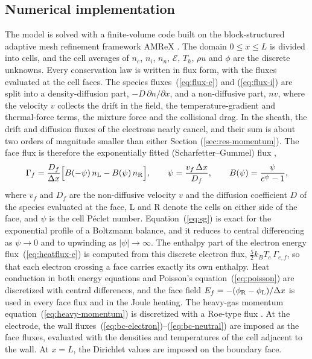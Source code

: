 \subsection{Numerical implementation}
\label{sec:numerics}

The model is solved with a finite-volume code built on the block-structured adaptive mesh refinement framework AMReX \cite{amrex2019}. The domain \(0\le x\le L\) is divided into cells, and the cell averages of \(n_e\), \(n_i\), \(n_n\), \(\mathcal{E}\), \(T_h\), \(\rho u\) and \(\phi\) are the discrete unknowns. Every conservation law is written in flux form, with the fluxes evaluated at the cell faces. The species fluxes~(\ref{eq:flux-e}) and (\ref{eq:flux-i}) are split into a density-diffusion part, \(-D\,\partial n/\partial x\), and a non-diffusive part, \(nv\), where the velocity \(v\) collects the drift in the field, the temperature-gradient and thermal-force terms, the mixture force and the collisional drag. In the sheath, the drift and diffusion fluxes of the electrons nearly cancel, and their sum is about two orders of magnitude smaller than either Section (\ref{sec:res-momentum}). The face flux is therefore the exponentially fitted (Scharfetter--Gummel) flux \cite{scharfetter1969},
\begin{equation}
\Gamma_{f}=\frac{D_f}{\Delta x}\Big[B(-\psi)\,n_{\rm L}-B(\psi)\,n_{\rm R}\Big],
\qquad
\psi=\frac{v_f\,\Delta x}{D_f},
\qquad
B(\psi)=\frac{\psi}{e^{\psi}-1},
\label{eq:sg}
\end{equation}
where \(v_f\) and \(D_f\) are the non-diffusive velocity \(v\) and the diffusion coefficient \(D\) of the species evaluated at the face, L and R denote the cells on either side of the face, and \(\psi\) is the cell Péclet number. Equation~(\ref{eq:sg}) is exact for the exponential profile of a Boltzmann balance, and it reduces to central differencing as \(\psi\to0\) and to upwinding as \(|\psi|\to\infty\). The enthalpy part of the electron energy flux~(\ref{eq:heatflux-e}) is computed from this discrete electron flux, \(\tfrac52k_BT_e\,\Gamma_{e,f}\), so that each electron crossing a face carries exactly its own enthalpy. Heat conduction in both energy equations and Poisson's equation~(\ref{eq:poisson}) are discretized with central differences, and the face field \(E_f=-(\phi_{\rm R}-\phi_{\rm L})/\Delta x\) is used in every face flux and in the Joule heating. The heavy-gas momentum equation~(\ref{eq:heavy-momentum}) is discretized with a Roe-type flux \cite{roe1981}. At the electrode, the wall fluxes~(\ref{eq:bc-electron})--(\ref{eq:bc-neutral}) are imposed as the face fluxes, evaluated with the densities and temperatures of the cell adjacent to the wall. At \(x=L\), the Dirichlet values are imposed on the boundary face.

